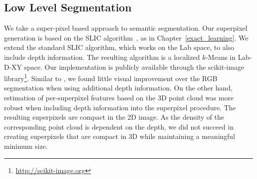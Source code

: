 \subsection{Low Level Segmentation}
We take a super-pixel based approach to semantic segmentation.
Our superpixel generation is based on the SLIC
algorithm~\citep{achanta2012slic}, as in Chapter~\ref{exact_learning}. We
extend the standard SLIC algorithm, which works on the Lab space, to also
include depth information. The resulting algorithm is a localized $k$-Means in
Lab-D-XY space.
Our implementation is publicly available through the scikit-image library\footnote{\url{http://scikit-image.org}}.
Similar to \citet{SilbermanECCV12}, we found little visual improvement over the
RGB segmentation when using additional depth information. On the other hand,
estimation of per-superpixel features based on the 3D point cloud was more
robust when including depth information into the superpixel procedure.
The resulting superpixels are compact in the 2D image. As the density of the
corresponding point cloud is dependent on the depth, we did not succeed in
creating superpixels that are compact in 3D while maintaining a meaningful
minimum size.

